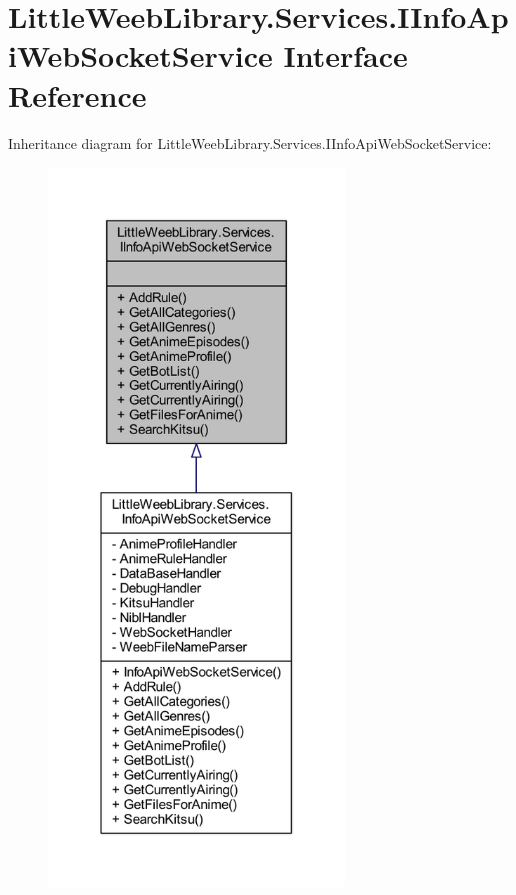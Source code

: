 \hypertarget{interface_little_weeb_library_1_1_services_1_1_i_info_api_web_socket_service}{}\section{Little\+Weeb\+Library.\+Services.\+I\+Info\+Api\+Web\+Socket\+Service Interface Reference}
\label{interface_little_weeb_library_1_1_services_1_1_i_info_api_web_socket_service}


Inheritance diagram for Little\+Weeb\+Library.\+Services.\+I\+Info\+Api\+Web\+Socket\+Service\+:\nopagebreak
\begin{figure}[H]
\begin{center}
\leavevmode
\includegraphics[width=223pt]{interface_little_weeb_library_1_1_services_1_1_i_info_api_web_socket_service__inherit__graph}
\end{center}
\end{figure}


